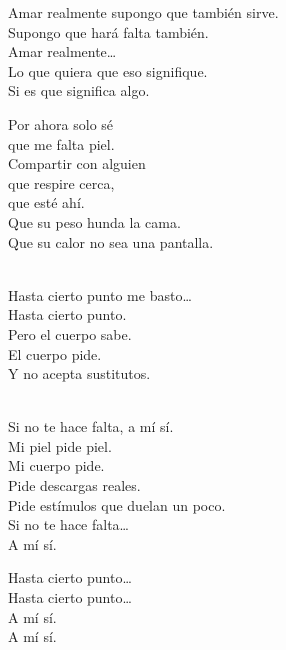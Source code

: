 \begin{lyrics}
Amar realmente supongo que también sirve.\\
Supongo que hará falta también.\\
Amar realmente…\\
Lo que quiera que eso signifique.\\
Si es que significa algo.

Por ahora solo sé\\
que me falta piel.\\
Compartir con alguien\\
que respire cerca,\\
que esté ahí.\\
Que su peso hunda la cama.\\
Que su calor no sea una pantalla.

\\
Hasta cierto punto me basto…\\
Hasta cierto punto.\\
Pero el cuerpo sabe.\\
El cuerpo pide.\\
Y no acepta sustitutos.

\\
Si no te hace falta, a mí sí.\\
Mi piel pide piel.\\
Mi cuerpo pide.\\
Pide descargas reales.\\
Pide estímulos que duelan un poco.\\
Si no te hace falta…\\
A mí sí.

Hasta cierto punto…\\
Hasta cierto punto…\\
A mí sí.\\
A mí sí.
\end{lyrics}

